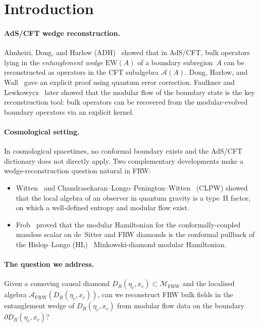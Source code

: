 \documentclass[11pt,a4paper]{article}
\theoremstyle{remark}
\newcommand{\FRW}{{\mathrm{FRW}}}
\newcommand{\EW}{{\mathrm{EW}}}
\newcommand{\A}{\mathcal{A}}
\newcommand{\DR}{D_R(\eta_c,x_c)}
\begin{document}
\section{Introduction}
\label{sec:intro}

\paragraph{AdS/CFT wedge reconstruction.}
Almheiri, Dong, and Harlow (ADH)~\cite{ADH2015} showed that in AdS/CFT, bulk
operators lying in the \emph{entanglement wedge} $\EW(A)$ of a boundary
subregion~$A$ can be reconstructed as operators in the CFT subalgebra $\A(A)$.
Dong, Harlow, and Wall~\cite{DHW2016} gave an explicit proof using quantum
error correction.  Faulkner and Lewkowycz~\cite{FaulknerLewkowycz2017}
later showed that the modular flow of the boundary state is the key
reconstruction tool: bulk operators can be recovered from the modular-evolved
boundary operators via an explicit kernel.

\paragraph{Cosmological setting.}
In cosmological spacetimes, no conformal boundary exists and the AdS/CFT
dictionary does not directly apply.  Two complementary developments make a
wedge-reconstruction question natural in FRW:

\begin{itemize}
\item Witten~\cite{Witten2022} and
  Chandrasekaran--Longo--Penington--Witten~\cite{CLPW2022} (CLPW) showed
  that the local algebra of an observer in quantum gravity is a type~II
  factor, on which a well-defined entropy and modular flow exist.
\item Frob~\cite{Frob2023} proved that the modular Hamiltonian for the
  conformally-coupled massless scalar on de~Sitter and FRW diamonds is
  the conformal pullback of the Hislop--Longo (HL)~\cite{HislopLongo1982}
  Minkowski-diamond modular Hamiltonian.
\end{itemize}

\paragraph{The question we address.}
Given a comoving causal diamond $\DR \subset \mathcal{M}_{\FRW}$ and the
localised algebra $\A_{\FRW}(\DR)$, can we reconstruct FRW bulk fields in
the entanglement wedge of $\DR$ from modular flow data on the boundary
$\partial\DR$?
\end{document}
